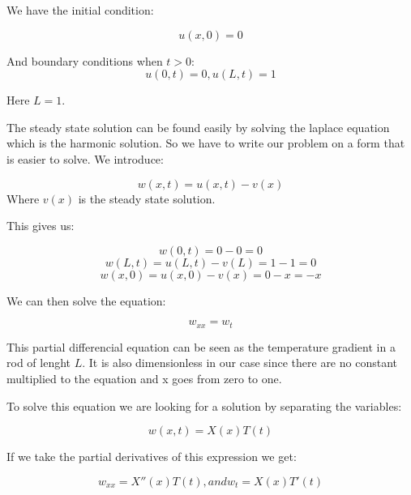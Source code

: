 \documentclass[a4paper,10pt]{article}
\begin{document}
We have the initial condition:

\begin{equation}
 u(x,0) = 0
\end{equation}

And boundary conditions when $t>0$:
\begin{equation}
 u(0,t) = 0,
 u(L,t) = 1
\end{equation}

Here $L=1$.

The steady state solution can be found easily by solving the laplace equation which is the harmonic solution. So we have to write our problem on 
a form that is easier to solve. We introduce:

\begin{equation}
 w(x,t) = u(x,t) - v(x)
 \label{WritingEasier}
\end{equation}
Where $v(x)$ is the steady state solution.

This gives us:

\begin{equation}
 w(0,t) = 0 - 0 = 0
\end{equation}
\begin{equation}
w(L,t) = u(L,t) - v(L) = 1 -1 = 0  
\end{equation}
\begin{equation}
 w(x,0) = u(x,0) - v(x) = 0 -x = -x
\end{equation}

We can then solve the equation:

\begin{equation}
 w_{xx}=w_t
 \label{eq:simpleDiff}
\end{equation}

This partial differencial equation can be seen as the temperature gradient in a rod of lenght $L$. It is also dimensionless in our case
since there are no constant multiplied to the equation and x goes from zero to one.

To solve this equation we are looking for a solution by separating the variables:

\begin{equation}
w(x,t) = X(x)T(t)
\label{eq:seperating}
\end{equation}

If we take the partial derivatives of this expression we get:

\begin{equation}
w_{xx} = X''(x)T(t) ,and w_t = X(x)T'(t)
\label{eq:deriv}
\end{equation}
\end{document}
